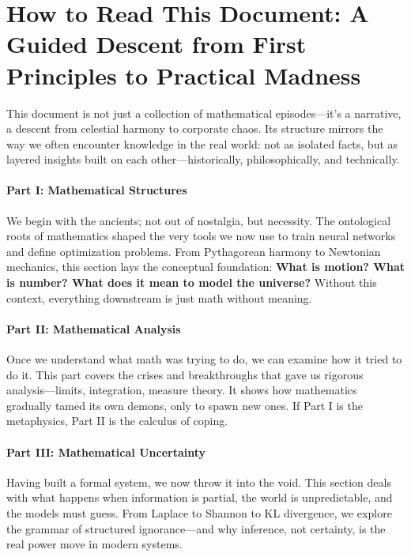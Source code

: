 \section{How to Read This Document: A Guided Descent from First Principles to Practical Madness}

This document is not just a collection of mathematical episodes—it’s a narrative, a descent from celestial harmony to corporate chaos. Its structure mirrors the way we often encounter knowledge in the real world: not as isolated facts, but as layered insights built on each other—historically, philosophically, and technically.

\paragraph{Part I: Mathematical Structures}
We begin with the ancients; not out of nostalgia, but necessity. The ontological roots of mathematics shaped the very tools we now use to train neural networks and define optimization problems. From Pythagorean harmony to Newtonian mechanics, this section lays the conceptual foundation: \textbf{What is motion? What is number? What does it mean to model the universe?} Without this context, everything downstream is just math without meaning.

\paragraph{Part II: Mathematical Analysis}
Once we understand what math was trying to do, we can examine how it tried to do it. This part covers the crises and breakthroughs that gave us rigorous analysis—limits, integration, measure theory. It shows how mathematics gradually tamed its own demons, only to spawn new ones. If Part I is the metaphysics, Part II is the calculus of coping.

\paragraph{Part III: Mathematical Uncertainty}
Having built a formal system, we now throw it into the void. This section deals with what happens when information is partial, the world is unpredictable, and the models must guess. From Laplace to Shannon to KL divergence, we explore the grammar of structured ignorance—and why inference, not certainty, is the real power move in modern systems.

